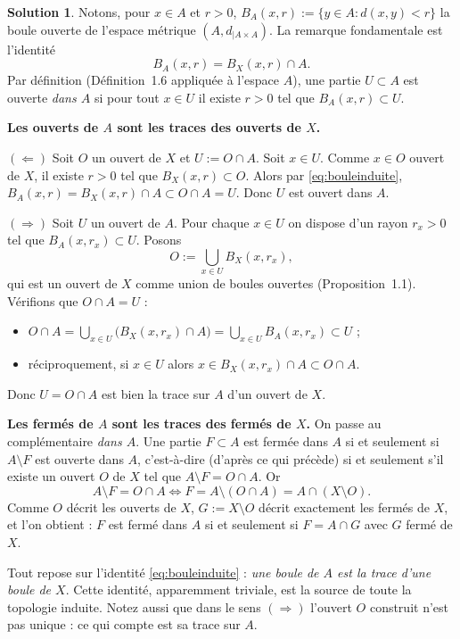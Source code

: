 \documentclass[11pt,a4paper]{article}
\newcommand{\ie}{c'est-à-dire}
\theoremstyle{definition}
\newtheorem*{solution}{Solution}
\begin{document}
\begin{solution}
Notons, pour $x\in A$ et $r>0$, $B_A(x,r) := \{y\in A : d(x,y)<r\}$ la boule ouverte de l'espace métrique $(A,d_{|A\times A})$. La remarque fondamentale est l'identité
\begin{equation}\label{eq:bouleinduite}
B_A(x,r) = B_X(x,r)\cap A .
\end{equation}
Par définition (Définition~1.6 appliquée à l'espace $A$), une partie $U\subset A$ est ouverte \emph{dans $A$} si pour tout $x\in U$ il existe $r>0$ tel que $B_A(x,r)\subset U$.

\medskip
\noindent\textbf{Les ouverts de $A$ sont les traces des ouverts de $X$.}

\noindent$(\Leftarrow)$ Soit $O$ un ouvert de $X$ et $U:=O\cap A$. Soit $x\in U$. Comme $x\in O$ ouvert de $X$, il existe $r>0$ tel que $B_X(x,r)\subset O$. Alors par \eqref{eq:bouleinduite}, $B_A(x,r)=B_X(x,r)\cap A\subset O\cap A = U$. Donc $U$ est ouvert dans $A$.

\noindent$(\Rightarrow)$ Soit $U$ un ouvert de $A$. Pour chaque $x\in U$ on dispose d'un rayon $r_x>0$ tel que $B_A(x,r_x)\subset U$. Posons
\[
O := \bigcup_{x\in U} B_X(x,r_x),
\]
qui est un ouvert de $X$ comme union de boules ouvertes (Proposition~1.1). Vérifions que $O\cap A = U$ :
\begin{itemize}
  \item $O\cap A = \bigcup_{x\in U}\big(B_X(x,r_x)\cap A\big) = \bigcup_{x\in U} B_A(x,r_x)\subset U$ ;
  \item réciproquement, si $x\in U$ alors $x\in B_X(x,r_x)\cap A\subset O\cap A$.
\end{itemize}
Donc $U=O\cap A$ est bien la trace sur $A$ d'un ouvert de $X$.

\medskip
\noindent\textbf{Les fermés de $A$ sont les traces des fermés de $X$.} On passe au complémentaire \emph{dans $A$}. Une partie $F\subset A$ est fermée dans $A$ si et seulement si $A\setminus F$ est ouverte dans $A$, \ie{} (d'après ce qui précède) si et seulement s'il existe un ouvert $O$ de $X$ tel que $A\setminus F = O\cap A$. Or
\[
A\setminus F = O\cap A \iff F = A\setminus (O\cap A) = A\cap (X\setminus O).
\]
Comme $O$ décrit les ouverts de $X$, $G:=X\setminus O$ décrit exactement les fermés de $X$, et l'on obtient : $F$ est fermé dans $A$ si et seulement si $F=A\cap G$ avec $G$ fermé de $X$.
\end{solution}

\begin{pointcle}
Tout repose sur l'identité \eqref{eq:bouleinduite} : \emph{une boule de $A$ est la trace d'une boule de $X$}. Cette identité, apparemment triviale, est la source de toute la topologie induite. Notez aussi que dans le sens $(\Rightarrow)$ l'ouvert $O$ construit n'est pas unique : ce qui compte est sa trace sur $A$.
\end{pointcle}
\end{document}
